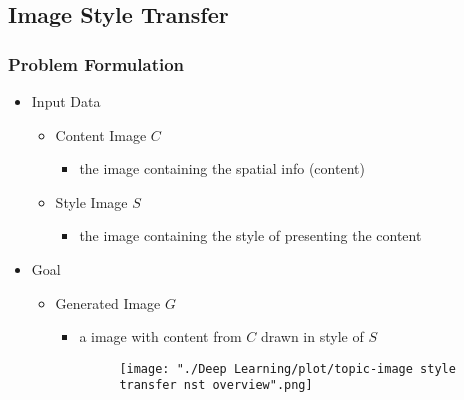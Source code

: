 \subsection{Image Style Transfer}
\subsubsection{Problem Formulation}
\begin{itemize}
\item Input Data
	\begin{itemize}
	\item Content Image $C$
		\begin{itemize}
		\item the image containing the spatial info (content)
		\end{itemize}
	\item Style Image $S$
		\begin{itemize}
		\item the image containing the style of presenting the content
		\end{itemize}
	\end{itemize}
\item Goal
	\begin{itemize}
	\item Generated Image $G$
		\begin{itemize}
		\item a image with content from $C$ drawn in style of $S$
		\begin{figure}[ht]
		\texttt{[image: "./Deep Learning/plot/topic-image style transfer nst overview".png]}
		\end{figure}
		\end{itemize}
	\end{itemize}
\end{itemize}

